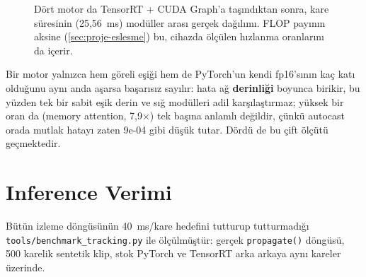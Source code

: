 \begin{figure}[H]
  \centering
  \caption{Dört motor da TensorRT + CUDA Graph'a taşındıktan sonra,
    kare süresinin (25,56~ms) modüller arası gerçek dağılımı. FLOP
    payının aksine (\cref{sec:proje-eslesme}) bu, cihazda ölçülen
    hızlanma oranlarını da içerir.}
  \label{fig:sure-dagilimi}
\end{figure}

Bir motor yalnızca hem göreli eşiği hem de PyTorch'un kendi fp16'sının
kaç katı olduğunu aynı anda aşarsa başarısız sayılır: hata ağ
\textbf{derinliği} boyunca birikir, bu yüzden tek bir sabit eşik derin
ve sığ modülleri adil karşılaştırmaz; yüksek bir oran da (memory
attention, 7,9×) tek başına anlamlı değildir, çünkü autocast orada
mutlak hatayı zaten 9e-04 gibi düşük tutar. Dördü de bu çift ölçütü
geçmektedir.

\section{Inference Verimi}
\label{sec:inference-verimi}

Bütün izleme döngüsünün 40~ms/kare hedefini tutturup tutturmadığı
\texttt{tools/benchmark\_tracking.py} ile ölçülmüştür: gerçek
\texttt{propagate()} döngüsü, 500 karelik sentetik klip, stok PyTorch
ve TensorRT arka arkaya aynı kareler üzerinde.

